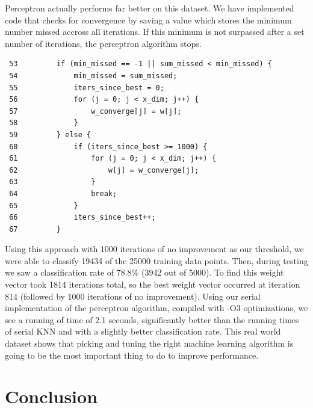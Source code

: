 \documentclass{article}
\begin{document}
Perceptron actually performs far better on this dataset. We have implemented code that checks for convergence by saving a value which stores the minimum number missed accross all iterations. If this minimum is not surpassed after a set number of iterations, the perceptron algorithm stops.
\begin{verbatim}
 53         if (min_missed == -1 || sum_missed < min_missed) {
 54             min_missed = sum_missed;
 55             iters_since_best = 0;
 56             for (j = 0; j < x_dim; j++) {
 57                 w_converge[j] = w[j];
 58             }
 59         } else {
 60             if (iters_since_best >= 1000) {
 61                 for (j = 0; j < x_dim; j++) {
 62                     w[j] = w_converge[j];
 63                 }
 64                 break;
 65             }
 66             iters_since_best++;
 67         }
\end{verbatim}

Using this approach with 1000 iterations of no improvement as our threshold, we were able to classify 19434 of the 25000 training data points. Then, during testing we saw a classification rate of 78.8\% (3942 out of 5000). To find this weight vector took 1814 iterations total, so the best weight vector occurred at iteration 814 (followed by 1000 iterations of no improvement). Using our serial implementation of the perceptron algorithm, compiled with -O3 optimizations, we see a running of time of 2.1 seconds, significantly better than the running times of serial KNN and with a slightly better classification rate. This real world dataset shows that picking and tuning the right machine learning algorithm is going to be the most important thing to do to improve performance.

\section{Conclusion}
\end{document}

